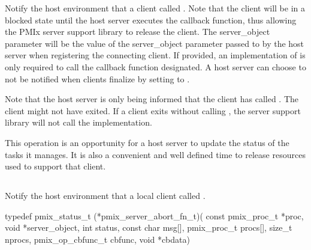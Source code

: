 \descr

Notify the host environment that a client called .
Note that the client will be in a blocked state until the host server executes the callback function, thus allowing the PMIx server support library to release the client.
The server_object parameter will be the value of the server_object parameter passed to
 by the host server when registering the connecting client.  If provided, an implementation of 
is only required to
call the callback function designated.  A host server can choose to not be notified when clients finalize by setting  to .

Note that the host server is only being informed that the client has called .  The client might not have exited.  If a client
exits without calling , the server support library will not call the  implementation.

\advicermstart
This operation is an opportunity for a host server
to update the status of the tasks it manages.  It is also a convenient and well defined time to release resources used to support that client.
\advicermend


\subsection{}

\summary

Notify the host environment that a local client called .

\format

\cspecificstart
\begin{codepar}
typedef pmix_status_t (*pmix_server_abort_fn_t)(
                             const pmix_proc_t *proc,
                             void *server_object,
                             int status,
                             const char msg[],
                             pmix_proc_t procs[],
                             size_t nprocs,
                             pmix_op_cbfunc_t cbfunc,
                             void *cbdata)
\end{codepar}
\cspecificend


\begin{arglist}
\end{arglist}

